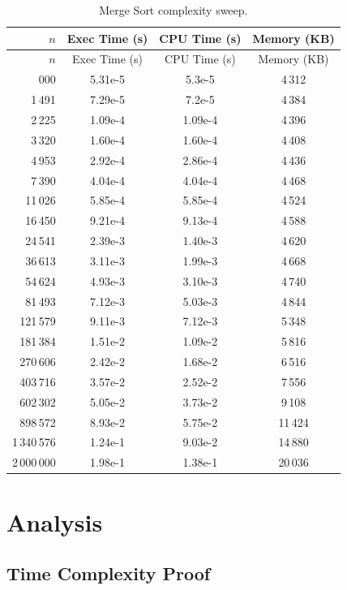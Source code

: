 \documentclass[12pt,a4paper]{report}
\begin{document}
\begin{longtable}{rSSS}
\caption{Merge Sort complexity sweep.}
\label{tab:merge}\\
\toprule
$n$ & {Exec Time (s)} & {CPU Time (s)} & {Memory (KB)} \\
\midrule
\endfirsthead
\toprule
$n$ & {Exec Time (s)} & {CPU Time (s)} & {Memory (KB)} \\
\midrule
\endhead
\bottomrule
{}\,000 & 5.31e-5  & 5.3e-5  &  4\,312 \\
       1\,491 & 7.29e-5  & 7.2e-5  &  4\,384 \\
       2\,225 & 1.09e-4  & 1.09e-4 &  4\,396 \\
       3\,320 & 1.60e-4  & 1.60e-4 &  4\,408 \\
       4\,953 & 2.92e-4  & 2.86e-4 &  4\,436 \\
       7\,390 & 4.04e-4  & 4.04e-4 &  4\,468 \\
      11\,026 & 5.85e-4  & 5.85e-4 &  4\,524 \\
      16\,450 & 9.21e-4  & 9.13e-4 &  4\,588 \\
      24\,541 & 2.39e-3  & 1.40e-3 &  4\,620 \\
      36\,613 & 3.11e-3  & 1.99e-3 &  4\,668 \\
      54\,624 & 4.93e-3  & 3.10e-3 &  4\,740 \\
      81\,493 & 7.12e-3  & 5.03e-3 &  4\,844 \\
     121\,579 & 9.11e-3  & 7.12e-3 &  5\,348 \\
     181\,384 & 1.51e-2  & 1.09e-2 &  5\,816 \\
     270\,606 & 2.42e-2  & 1.68e-2 &  6\,516 \\
     403\,716 & 3.57e-2  & 2.52e-2 &  7\,556 \\
     602\,302 & 5.05e-2  & 3.73e-2 &  9\,108 \\
     898\,572 & 8.93e-2  & 5.75e-2 & 11\,424 \\
   1\,340\,576 & 1.24e-1  & 9.03e-2 & 14\,880 \\
   2\,000\,000 & 1.98e-1  & 1.38e-1 & 20\,036 \\
\end{longtable}

\section{Analysis}

\subsection{Time Complexity Proof}
\end{document}
